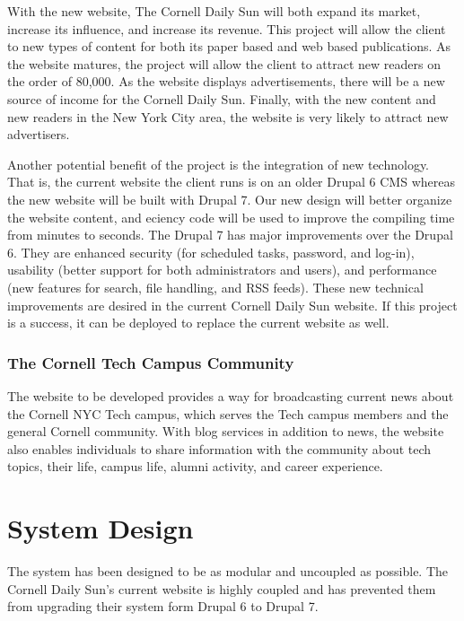 \documentclass[12pt]{article} %
\begin{document}
With the new website, The Cornell Daily Sun will both expand its market, increase its influence, and increase its revenue. This project will allow the client to new types of content for both its paper based and web based publications. As the website matures, the project will allow the client to attract new readers on the order of 80,000. As the website displays advertisements, there will be a new source of income for the Cornell Daily Sun. Finally, with the new content and new readers in the New York City area, the website is very likely to attract new advertisers.
                   
Another potential benefit of the project is the integration of new technology. That is, the current website the client runs is on an older Drupal 6 CMS whereas the new website will be built with Drupal 7. Our new design will better organize the website content, and eciency code will be used to improve the compiling time from minutes to seconds. The Drupal 7 has major improvements over the Drupal 6. They are enhanced security (for scheduled tasks, password, and log-in), usability (better support for both administrators and users), and performance (new features for search, file handling, and RSS feeds). These new technical improvements are desired in the current Cornell Daily Sun website. If this project is a success, it can be deployed to replace the current website as well.
                   
\subsubsection{The Cornell Tech Campus Community}
                   
The website to be developed provides a way for broadcasting current news about the Cornell NYC Tech campus, which serves the Tech campus members and the general Cornell community. With blog services in addition to news, the website also enables individuals to share information with the community about tech topics, their life, campus life, alumni activity, and career experience. 

\section{System Design}

The system has been designed to be as modular and uncoupled as possible. The Cornell Daily Sun’s current website is highly coupled and has prevented them from upgrading their system form Drupal 6 to Drupal 7.
\end{document}

